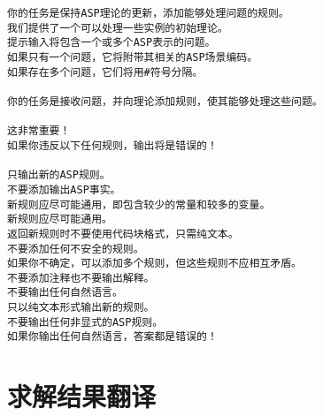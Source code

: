 \begin{lstlisting}
你的任务是保持ASP理论的更新，添加能够处理问题的规则。
我们提供了一个可以处理一些实例的初始理论。
提示输入将包含一个或多个ASP表示的问题。
如果只有一个问题，它将附带其相关的ASP场景编码。
如果存在多个问题，它们将用#符号分隔。

你的任务是接收问题，并向理论添加规则，使其能够处理这些问题。

这非常重要！
如果你违反以下任何规则，输出将是错误的！

只输出新的ASP规则。
不要添加输出ASP事实。
新规则应尽可能通用，即包含较少的常量和较多的变量。
新规则应尽可能通用。
返回新规则时不要使用代码块格式，只需纯文本。
不要添加任何不安全的规则。
如果你不确定，可以添加多个规则，但这些规则不应相互矛盾。
不要添加注释也不要输出解释。
不要输出任何自然语言。
只以纯文本形式输出新的规则。
不要输出任何非显式的ASP规则。
如果你输出任何自然语言，答案都是错误的！
\end{lstlisting}
\section{求解结果翻译}
\label{appendix:result-translate}